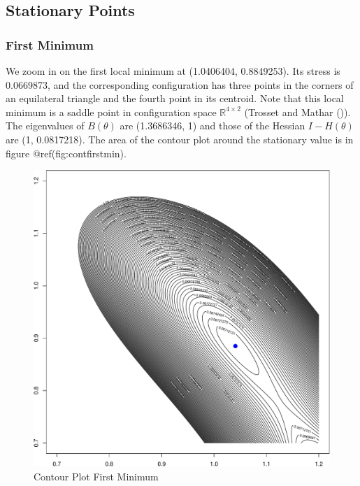 \documentclass[
  12pt,
  letterpaper,
  DIV=11,
  numbers=noendperiod]{scrreprt}
\theoremstyle{remark}
\begin{document}
\subsection{Stationary Points}\label{stationary-points}

\subsubsection{First Minimum}\label{first-minimum}

We zoom in on the first local minimum at (1.0406404, 0.8849253). Its
stress is 0.0669873, and the corresponding configuration has three
points in the corners of an equilateral triangle and the fourth point in
its centroid. Note that this local minimum is a saddle point in
configuration space \(\mathbb{R}^{4\times 2}\) (Trosset and Mathar
()). The eigenvalues of
\(B(\theta)\) are (1.3686346, 1) and those of the Hessian
\(I-H(\theta)\) are (1, 0.0817218). The area of the contour plot around
the stationary value is in figure @ref(fig:contfirstmin).

\begin{figure}[H]

{\centering \includegraphics{spaces_files/figure-pdf/contfirstmin-1.pdf}

}

\caption{Contour Plot First Minimum}

\end{figure}%
\end{document}
